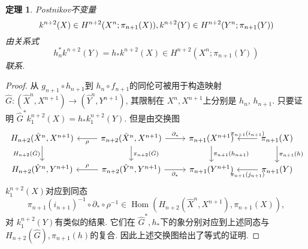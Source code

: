 \documentclass{ctexart}
\theoremstyle{plain}
\newtheorem{theorem}{定理}[section]
\theoremstyle{definition}
\begin{document}
        \begin{theorem}
            Postnikov不变量
            \begin{equation*}
              k^{n+2}(X)\in H^{n+2}(X^{n};\pi_{n+1}(X)), \\
              k^{n+2}(Y)\in H^{n+2}(Y^{n};\pi_{n+1}(Y))
            \end{equation*}
            由关系式
            \begin{equation*}
              h^{*}_{n}k^{n+2}(Y)=h_* k^{n+2}(X) \in H^{n+2}(X^{n};\pi_{n+1}(Y))
            \end{equation*}
            联系.
        \end{theorem}

        \begin{proof}
            从 $g_{n+1}\circ h_{n+1}$到 $h_{n}\circ f_{n+1}$的同伦可被用于构造映射 $\hat{G}:(\hat{X}^{n},X^{n+1})\to (\hat{Y}^{n},Y^{n+1})$, 其限制在 $X^{n},X^{n+1}$上分别是 $h_{n}$, $h_{n+1}$. 只要证明 $\hat{G}^{*}k_1^{n+2}(X)=h_*k_1^{n+2}(Y)$. 但是由交换图
            \begin{equation*}
              \begin{tikzcd}
                H_{n+2}(\hat{X}^{n},X^{n+1}) \arrow[d, "H_{n+2}(\hat{G})"'] & \pi_{n+2}(\hat{X}^{n},X^{n+1}) \arrow[l, "\rho"] \arrow[d, "\pi_{n+2}(\hat{G})"] \arrow[r, "\partial_*"] & \pi_{n+1}(X^{n+1}) \arrow[d, "\pi_{n+1}(h_{n+1})"] & \pi_{n+1}(X) \arrow[l, "\pi_{n+1}(i_{n+1})"'] \arrow[d, "\pi_{n+1}(h)"] \\
                H_{n+2}(\hat{Y}^{n},Y^{n+1}) & \pi_{n+2}(\hat{Y}^{n},Y^{n+1}) \arrow[l, "\rho"'] \arrow[r, "\partial_*"'] & \pi_{n+1}(Y^{n+1}) & \pi_{n+1}(Y) \arrow[l, "\pi_{n+1}(j_{n+1})"]
              \end{tikzcd}
            \end{equation*}
            $k_1^{n+2}(X)$对应到同态
            \begin{equation*}
              \pi_{n+1}(i_{n+1})^{-1}\circ \partial_*\circ \rho^{-1} \in \operatorname{Hom}(H_{n+2}(\hat{X}^{n},X^{n+1}),\pi_{n+1}(X)),
            \end{equation*}
            对 $k_1^{n+2}(Y)$有类似的结果. 它们在 $\hat{G}^{*},h_*$下的象分别对应到上述同态与 $H_{n+2}(\hat{G}),\pi_{n+1}(h)$的复合. 因此上述交换图给出了等式的证明.
        \end{proof}
\end{document}
